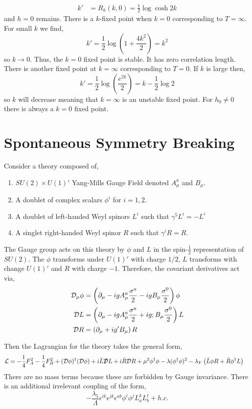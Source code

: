 \documentclass[12pt]{extarticle}
\begin{document}
\begin{align*}
k' & = R_k(k, 0) = \frac{1}{2} \log{\cosh{2 k}} 
\end{align*}
and $h = 0$ remains. There is a $k$-fixed point when $k = 0$ corresponding to $T = \infty$. For small $k$ we find,
\[ k' = \frac{1}{2} \log{\left( 1 + \frac{4 k^2}{2} \right)} = k^2 \]
so $k \to 0$. Thus, the $k = 0$ fixed point is stable. It has zero correlation length. There is another fixed point at $k = \infty$ corresponding to $T = 0$. If $k$ is large then,
\[ k' = \frac{1}{2} \log{\left( \frac{e^{2k}}{2} \right)} = k - \frac{1}{2} \log{2} \]
so $k$ will decrease meaning that $k = \infty$ is an unstable fixed point. For $h_0 \neq 0$ there is always a $k = 0$ fixed point. 

\section{Spontaneous Symmetry Breaking}

Consider a theory composed of,
\begin{enumerate}
\item $SU(2) \times U(1)'$ Yang-Mills Gauge Field denoted $A^a_\mu$ and $B_\mu$. 
\item A doublet of complex scalars $\phi^i$ for $i = 1,2$.
\item A doublet of left-handed Weyl spinors $L^i$ such that $\gamma^5 L^i = - L^i$
\item A singlet right-handed Weyl spinor $R$ such that $\gamma^i R = R$. 
\end{enumerate}
The Gauge group acts on this theory by $\phi$ and $L$ in the spin-$\frac{1}{2}$ representation of $SU(2)$. The $\phi$ transforms under $U(1)'$ with charge $1/2$, $L$ transforms with change $U(1)'$ and $R$ with charge $-1$. Therefore, the covariant derivatives act via,
\begin{align*}
\mathcal{D}_\mu \phi & = \left( \partial_\mu  - i g A_\mu^a \frac{\sigma^a}{2} - i g B_\mu \frac{\sigma^0}{2} \right) \phi
\\
\mathcal{D} L & = \left( \partial_\mu - i g A_\mu^a \frac{\sigma^a}{2} + i g; B_\mu \frac{\sigma^0}{2} \right) L
\\
\mathcal{D} R & = \left( \partial_\mu + i g' B_\mu \right) R
\end{align*}

Then the Lagrangian for the theory takes the general form,
\begin{align*}
\mathcal{L} & = - \frac{1}{4} F_A^2 - \frac{1}{4} F_B^2 + (\mathcal{D} \phi)^\dagger (\mathcal{D} \phi) + i \bar{L} \slashed{\mathcal{D}} L + i \bar{R} \mathcal{D} R + \mu^2 \phi^\dagger \phi - \lambda (\phi^\dagger \phi)^2 - \lambda_Y  \left( \bar{L} \phi R + \bar{R} \phi^\dagger L \right)
\end{align*}
There are no mass terms because these are forbidden by Gauge invariance. There is an additional irrelevant coupling of the form,
\[ - \frac{\lambda_5}{\Lambda} \epsilon^{ik} \epsilon^{j k} \epsilon^{ab} \phi^i \phi^j L^k_a L^\ell_b + h.c. \]
\end{document}

